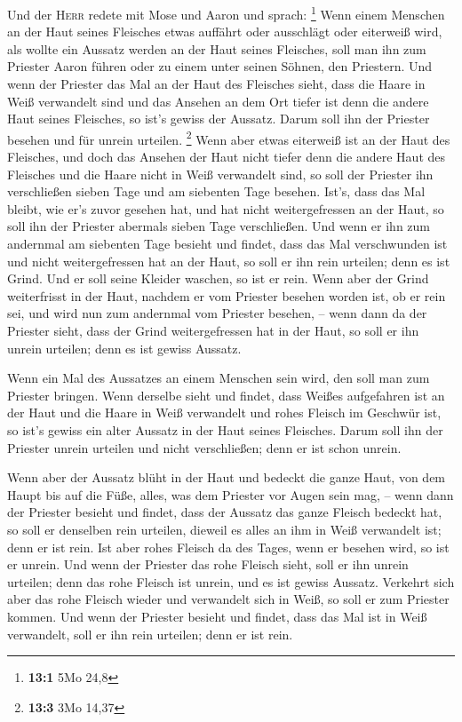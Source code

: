  Und der \textsc{Herr} redete mit Mose und Aaron und
sprach: \footnote{\textbf{13:1} 5Mo 24,8}  Wenn einem
Menschen an der Haut seines Fleisches etwas auffährt oder ausschlägt
oder eiterweiß wird, als wollte ein Aussatz werden an der Haut seines
Fleisches, soll man ihn zum Priester Aaron führen oder zu einem unter
seinen Söhnen, den Priestern.  Und wenn der Priester das
Mal an der Haut des Fleisches sieht, dass die Haare in Weiß verwandelt
sind und das Ansehen an dem Ort tiefer ist denn die andere Haut seines
Fleisches, so ist's gewiss der Aussatz. Darum soll ihn der Priester
besehen und für unrein urteilen. \footnote{\textbf{13:3} 3Mo 14,37}
 Wenn aber etwas eiterweiß ist an der Haut des Fleisches,
und doch das Ansehen der Haut nicht tiefer denn die andere Haut des
Fleisches und die Haare nicht in Weiß verwandelt sind, so soll der
Priester ihn verschließen sieben Tage  und am siebenten
Tage besehen. Ist's, dass das Mal bleibt, wie er's zuvor gesehen hat,
und hat nicht weitergefressen an der Haut,  so soll ihn
der Priester abermals sieben Tage verschließen. Und wenn er ihn zum
andernmal am siebenten Tage besieht und findet, dass das Mal
verschwunden ist und nicht weitergefressen hat an der Haut, so soll er
ihn rein urteilen; denn es ist Grind. Und er soll seine Kleider waschen,
so ist er rein.  Wenn aber der Grind weiterfrisst in der
Haut, nachdem er vom Priester besehen worden ist, ob er rein sei, und
wird nun zum andernmal vom Priester besehen, --  wenn dann
da der Priester sieht, dass der Grind weitergefressen hat in der Haut,
so soll er ihn unrein urteilen; denn es ist gewiss Aussatz.

 Wenn ein Mal des Aussatzes an einem Menschen sein wird,
den soll man zum Priester bringen.  Wenn derselbe sieht
und findet, dass Weißes aufgefahren ist an der Haut und die Haare in
Weiß verwandelt und rohes Fleisch im Geschwür ist,  so
ist's gewiss ein alter Aussatz in der Haut seines Fleisches. Darum soll
ihn der Priester unrein urteilen und nicht verschließen; denn er ist
schon unrein.

 Wenn aber der Aussatz blüht in der Haut und bedeckt die
ganze Haut, von dem Haupt bis auf die Füße, alles, was dem Priester vor
Augen sein mag, --  wenn dann der Priester besieht und
findet, dass der Aussatz das ganze Fleisch bedeckt hat, so soll er
denselben rein urteilen, dieweil es alles an ihm in Weiß verwandelt ist;
denn er ist rein.  Ist aber rohes Fleisch da des Tages,
wenn er besehen wird, so ist er unrein.  Und wenn der
Priester das rohe Fleisch sieht, soll er ihn unrein urteilen; denn das
rohe Fleisch ist unrein, und es ist gewiss Aussatz. 
Verkehrt sich aber das rohe Fleisch wieder und verwandelt sich in Weiß,
so soll er zum Priester kommen.  Und wenn der Priester
besieht und findet, dass das Mal ist in Weiß verwandelt, soll er ihn
rein urteilen; denn er ist rein.

